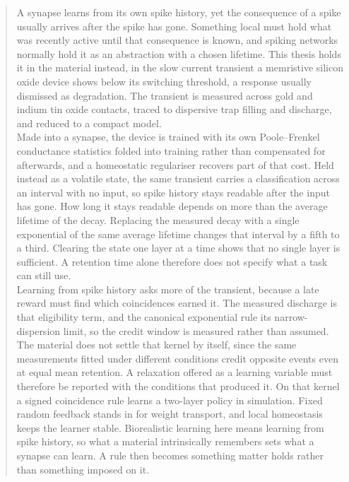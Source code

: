 \begin{abstract}
\noindent A synapse learns from its own spike history, yet the consequence of a spike usually arrives after
the spike has gone. Something local must hold what was recently active until that consequence is
known, and spiking networks normally hold it as an abstraction with a chosen lifetime. This thesis
holds it in the material instead, in the slow current transient a memristive silicon oxide device
shows below its switching threshold, a response usually dismissed as degradation. The transient is
measured across gold and indium tin oxide contacts, traced to dispersive trap filling and
discharge, and reduced to a compact model.\\

\noindent Made into a synapse, the device is trained with its own Poole--Frenkel conductance statistics
folded into training rather than compensated for afterwards, and a homeostatic regulariser
recovers part of that cost. Held instead as a volatile state, the same transient carries a
classification across an interval with no input, so spike history stays readable after the input
has gone. How long it stays readable depends on more than the average lifetime of the decay.
Replacing the measured decay with a single exponential of the same average lifetime changes that
interval by a fifth to a third. Clearing the state one layer at a time shows that no single layer
is sufficient. A retention time alone therefore does not specify what a task can still use.\\

\noindent Learning from spike history asks more of the transient, because a late reward must find which
coincidences earned it. The measured discharge is that eligibility term, and the canonical
exponential rule its narrow-dispersion limit, so the credit window is measured rather than
assumed. The material does not settle that kernel by itself, since the same measurements fitted
under different conditions credit opposite events even at equal mean retention. A relaxation
offered as a learning variable must therefore be reported with the conditions that produced it. On
that kernel a signed coincidence rule learns a two-layer policy in simulation. Fixed random
feedback stands in for weight transport, and local homeostasis keeps the learner stable.
Biorealistic learning here means
learning from spike history, so what a material intrinsically remembers sets what a synapse can
learn. A rule then becomes something matter holds rather than something imposed on it.
\end{abstract}
